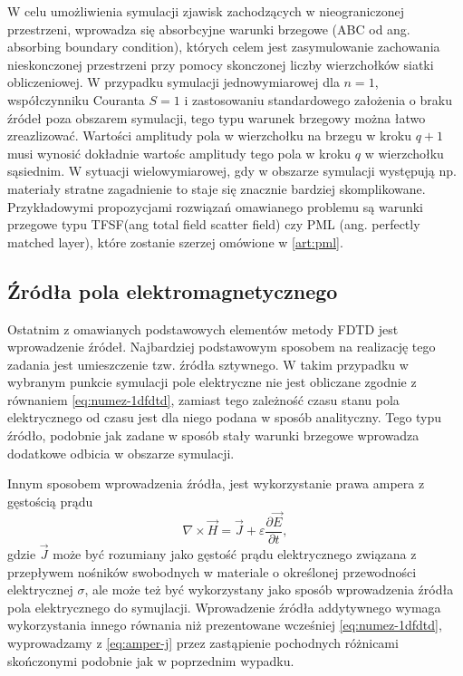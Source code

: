 W celu umożliwienia symulacji zjawisk zachodzących w nieograniczonej przestrzeni, wprowadza się absorbcyjne warunki brzegowe (ABC od ang. absorbing boundary condition), których celem jest zasymulowanie zachowania nieskonczonej przestrzeni przy pomocy skonczonej liczby wierzchołków siatki obliczeniowej. W przypadku symulacji jednowymiarowej dla $n=1$, współczynniku Couranta $S=1$ i zastosowaniu standardowego założenia o braku źródeł poza obszarem symulacji, tego typu warunek brzegowy można łatwo zreazlizować. Wartości amplitudy pola w wierzchołku na brzegu w kroku $q+1$ musi wynosić dokładnie wartośc amplitudy tego pola w kroku $q$ w wierzchołku sąsiednim. W sytuacji wielowymiarowej, gdy w obszarze symulacji występują np. materiały stratne zagadnienie to staje się znacznie bardziej skomplikowane. Przykładowymi propozycjami rozwiązań omawianego problemu są warunki przegowe typu TFSF(ang total field scatter field) czy PML (ang. perfectly matched layer), które zostanie szerzej omówione w \ref{art:pml}.

\subsection{Źródła pola elektromagnetycznego}
Ostatnim z omawianych podstawowych elementów metody FDTD jest wprowadzenie źródeł. Najbardziej podstawowym sposobem na realizację tego zadania jest umieszczenie tzw. źródła sztywnego. W takim przypadku w wybranym punkcie symulacji pole elektryczne nie jest obliczane zgodnie z równaniem \ref{eq:numez-1dfdtd}, zamiast tego zależność czasu stanu pola elektrycznego od czasu jest dla niego podana w sposób analityczny. Tego typu źródło, podobnie jak zadane w sposób stały warunki brzegowe wprowadza dodatkowe odbicia w obszarze symulacji.

Innym sposobem wprowadzenia źródła, jest wykorzystanie prawa ampera z gęstością prądu
\begin{equation}
\nabla \times \vec{H} = \vec{J} + \varepsilon \frac{\partial \vec{E}}{\partial t},
\label{eq:amper-j}
\end{equation}
gdzie $\vec{J}$ może być rozumiany jako gęstość prądu elektrycznego związana z przepływem nośników swobodnych w materiale o określonej przewodności elektrycznej $\sigma$, ale może też być wykorzystany jako sposób wprowadzenia źródła pola elektrycznego do symujlacji. Wprowadzenie źródła addytywnego wymaga wykorzystania innego równania niż prezentowane wcześniej \ref{eq:numez-1dfdtd}, wyprowadzamy z \ref{eq:amper-j} przez zastąpienie pochodnych różnicami skończonymi podobnie jak w poprzednim wypadku. 


